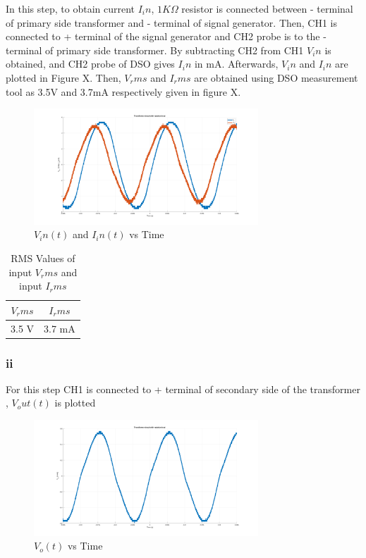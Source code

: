 \documentclass[letterpaper,12pt]{article}
\begin{document}
In this step, to obtain current \(I_in\), \(1K\Omega \) resistor is connected between - terminal of primary side transformer and - terminal of signal generator. Then, CH1 is connected to + terminal of the signal generator and CH2 probe is to the - terminal of primary side transformer. By subtracting CH2 from CH1 \(V_in\) is obtained, and CH2 probe of DSO gives \(I_in\) in mA. Afterwards, \(V_in\) and \(I_in\) are plotted in Figure X. Then, \(V_rms\) and \(I_rms\) are obtained using DSO measurement tool as 3.5V and 3.7mA respectively given in figure X. 
\begin{figure}[H]
    \centering
    \includegraphics[width = 0.75\textwidth]{2_1.png}
    \caption{\(V_in(t) \) and \(I_in(t)\) vs Time}
\end{figure} 

\begin{table}[H]
    \begin{center}
        \caption{RMS Values of input \(V_rms\) and input \(I_rms\)}
        \vspace{2mm}
        \begin{tabular}{||c | c ||} 
            \hline
            \(V_rms\) & \(I_rms\) \\ [0.5ex] 
            \hline\hline
            3.5 V & 3.7 mA    \\
            \hline
        \end{tabular}
    \end{center}
\end{table}



\subsubsection{ii}
For this step CH1 is connected to + terminal of secondary side of the transformer , \(V_out(t)\) is plotted 
\begin{figure}[H]
    \centering
    \includegraphics[width = 0.75\textwidth]{2_2.png}
    \caption{\(V_o(t) \) vs Time}
\end{figure} 
\end{document}
